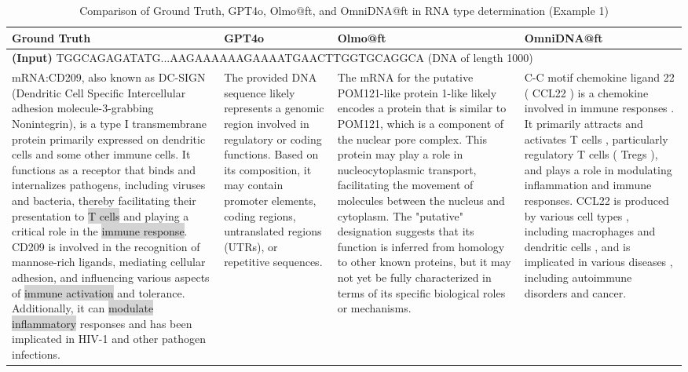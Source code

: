 \begin{table}[h]
    \centering
    \renewcommand{\arraystretch}{1.5}
    \begin{tabular}{|p{4cm}|p{4cm}|p{4cm}|p{4cm}|}
        \hline
        \textbf{Ground Truth} & \textbf{GPT4o} & \textbf{Olmo@ft} & \textbf{OmniDNA@ft} \\
        \hline
        \multicolumn{4}{|p{16cm}|}{\textbf{(Input)} TGGCAGAGATATG...AAGAAAAAAGAAAATGAACTTGGTGCAGGCA (DNA of length 1000) } \\
        \hline
       mRNA:CD209, also known as DC-SIGN (Dendritic Cell Specific Intercellular adhesion molecule-3-grabbing Nonintegrin), is a type I transmembrane protein primarily expressed on dendritic cells and some other immune cells. It functions as a receptor that binds and internalizes pathogens, including viruses and bacteria, thereby facilitating their presentation to  \colorbox{lightgrey}{T cells} and playing a critical role in the \colorbox{lightgrey}{immune response}. CD209 is involved in the recognition of mannose-rich ligands, mediating cellular adhesion, and influencing various aspects of \colorbox{lightgrey}{immune activation} and tolerance. Additionally, it can \colorbox{lightgrey}{modulate inflammatory} responses and has been implicated in HIV-1 and other pathogen infections. & The provided DNA sequence likely represents a genomic region involved in regulatory or coding functions. Based on its composition, it may contain promoter elements, coding regions, untranslated regions (UTRs), or repetitive sequences.  & The mRNA for the putative POM121-like protein 1-like likely encodes a protein that is similar to POM121, which is a component of the nuclear pore complex. This protein may play a role in nucleocytoplasmic transport, facilitating the movement of molecules between the nucleus and cytoplasm. The "putative" designation suggests that its function is inferred from homology to other known proteins, but it may not yet be fully characterized in terms of its specific biological roles or mechanisms. & C-C motif chemokine ligand 22 ( CCL22 ) is a chemokine involved in immune responses . It primarily attracts and \colorbox{lightgreenRGB}{activates T cells} , particularly regulatory T cells ( Tregs ), and plays a role in modulating inflammation and \colorbox{lightgreenRGB}{immune responses}. CCL22 is produced by various cell types , including macrophages and dendritic cells , and is implicated in various diseases , including autoimmune disorders and cancer. \\
        \hline
    \end{tabular}
    \caption{Comparison of Ground Truth, GPT4o, Olmo@ft, and OmniDNA@ft in RNA type determination (Example 1)}
    \label{tab:dna2func-1}
\end{table}



